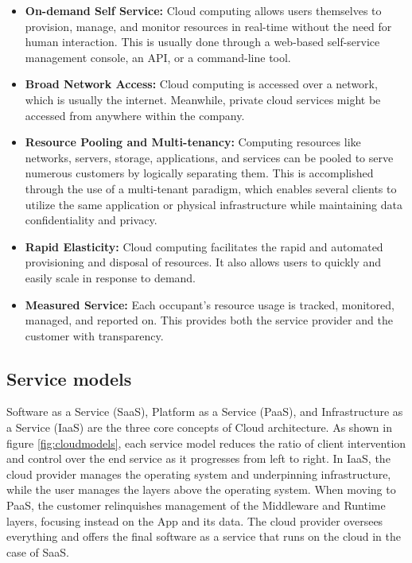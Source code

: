\begin{itemize}[label=\textbullet]
    \item \textbf{On-demand Self Service:} Cloud computing allows users themselves to provision, manage, and monitor resources in real-time without the need for human interaction. This is usually done through a web-based self-service management console, an API, or a command-line tool.
    \item \textbf{Broad Network Access:} Cloud computing is accessed over a network, which is usually the internet. Meanwhile, private cloud services might be accessed from anywhere within the company.
    \item \textbf{Resource Pooling and Multi-tenancy:} Computing resources like networks, servers, storage, applications, and services can be pooled to serve numerous customers by logically separating them. This is accomplished through the use of a multi-tenant paradigm, which enables several clients to utilize the same application or physical infrastructure while maintaining data confidentiality and privacy.
    \newpage
    \item \textbf{Rapid Elasticity:} Cloud computing facilitates the rapid and automated provisioning and disposal of resources. It also allows users to quickly and easily scale in response to demand.
    \item \textbf{Measured Service:} Each occupant's resource usage is tracked, monitored, managed, and reported on. This provides both the service provider and the customer with transparency.

\end{itemize} 

\subsection{Service models}
\qquad 

Software as a Service (SaaS), Platform as a Service (PaaS), and Infrastructure as a Service (IaaS) are the three core concepts of Cloud architecture. As shown in figure \ref{fig:cloudmodels}, each service model reduces the ratio of client intervention and control over the end service as it progresses from left to right. In IaaS, the cloud provider manages the operating system and underpinning infrastructure, while the user manages the layers above the operating system. When moving to PaaS, the customer relinquishes management of the Middleware and Runtime layers, focusing instead on the App and its data. The cloud provider oversees everything and offers the final software as a service that runs on the cloud in the case of SaaS.

